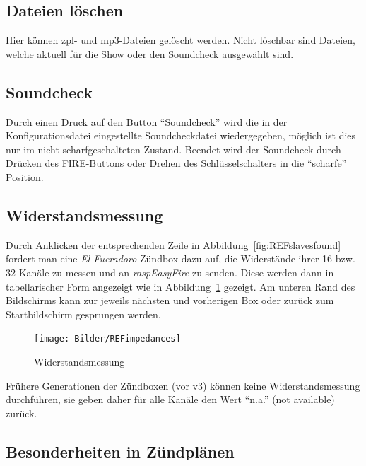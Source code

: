 \documentclass[paper=a4, parskip, numbers=noenddot, toc=listof, headsepline]{scrbook}
\newcommand{\anlage}{\emph{El Fueradoro}}
\newcommand{\REF}{\emph{raspEasyFire}}
\begin{document}
			    \subsection{Dateien löschen}
			        Hier können zpl- und mp3-Dateien gelöscht werden. Nicht löschbar sind Dateien, welche aktuell für die Show oder den Soundcheck ausgewählt sind.

			\subsection{Soundcheck}

				Durch einen Druck auf den Button \enquote{Soundcheck} wird die in der Konfigurationsdatei eingestellte Soundcheckdatei wiedergegeben, möglich ist dies nur im nicht scharfgeschalteten Zustand. Beendet wird der Soundcheck durch Drücken des FIRE-Buttons oder Drehen des Schlüsselschalters in die \enquote{scharfe} Position.

			\subsection{Widerstandsmessung}

				Durch Anklicken der entsprechenden Zeile in Abbildung~\ref{fig:REFslavesfound} fordert man eine {\anlage}-Zündbox dazu auf, die Widerstände ihrer 16 bzw. 32 Kanäle zu messen und an {\REF} zu senden. Diese werden dann in tabellarischer Form angezeigt wie in Abbildung~\ref{fig:REFimpedances} gezeigt. Am unteren Rand des Bildschirms kann zur jeweils nächsten und vorherigen Box oder zurück zum Startbildschirm gesprungen werden.

				\begin{figure}
					\centering\texttt{[image: Bilder/REFimpedances]}
					\caption{Widerstandsmessung}
					\label{fig:REFimpedances}
				\end{figure}
			
				Frühere Generationen der Zündboxen (vor v3) können keine Widerstandsmessung durchführen, sie geben daher für alle Kanäle den Wert \enquote{n.a.} (not available) zurück.
			
			\subsection{Besonderheiten in Zündplänen}
			
\end{document}
